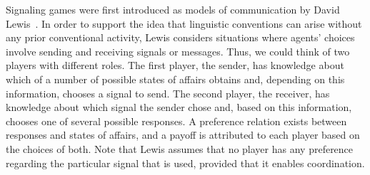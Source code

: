 \documentclass[a4paper]{article}
\begin{document}
Signaling games were first introduced as models of communication by David Lewis~\parencite*{lewis_convention_1969}.
In order to support the idea that linguistic conventions can arise without any prior conventional activity, Lewis considers situations where agents' choices involve sending and receiving signals or messages.
Thus, we could think of two players with different roles.
The first player, the sender, has knowledge about which of a number of possible states of affairs obtains and, depending on this information, chooses a signal to send.
The second player, the receiver, has knowledge about which signal the sender chose and, based on this information, chooses one of several possible responses.
A preference relation exists between responses and states of affairs, and a payoff is attributed to each player based on the choices of both.
Note that Lewis assumes that no player has any preference regarding the particular signal that is used, provided that it enables coordination.
\end{document}

